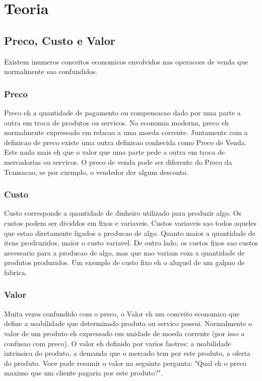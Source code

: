 \documentclass[12pt]{article}
\begin{document}
\section{Teoria}

\subsection{Preco, Custo e Valor}
Existem inumeros conceitos economicos envolvidos nas operacoes de venda que normalmente sao confundidos.

\subsubsection{Preco}
Preco eh a quantidade de pagamento ou compensacao dado por uma parte a outra em troca de produtos ou servicos. Na economia moderna, preco eh normalmente expressado em relacao a uma moeda corrente. Juntamente com a definicao de preco existe uma outra definicao conhecida como Preco de Venda. Este nada mais eh que o valor que uma parte pede a outra em troca de mercadorias ou servicos. O preco de venda pode ser diferente do Preco da Transacao, se por exemplo, o vendedor der algum desconto.

\subsubsection{Custo}
Custo corresponde a quantidade de dinheiro utilizado para produzir algo. Os custos podem ser dividdos em fixos e variaveis. Custos variaveis sao todos aqueles que estao diretamente ligados a producao de algo. Quanto maior a quantidade de itens prodruzidos, maior o custo variavel. De outro lado, os custos fixos sao custos necessario para a producao de algo, mas que nao variam com a quantidade de produtos produzidos. Um exemplo de custo fixo eh o aluguel de um galpao de fabrica.

\subsubsection{Valor}
Muita vezes confundido com o preco, o Valor eh um conceito economico que define a usabilidade que determinado produto ou servico possui. Normalmente o valor de um produto eh expressado em unidade de moeda corrente (por isso a confusao com preco). O valor eh definido por varios faotres: a usabilidade intrinsica do produto, a demanda que o mercado tem por este produto, a oferta do produto. Voce pode resumir o valor na seguinte pergunta: "Qual eh o preco maximo que um cliente pagaria por este produto?".
\end{document}
